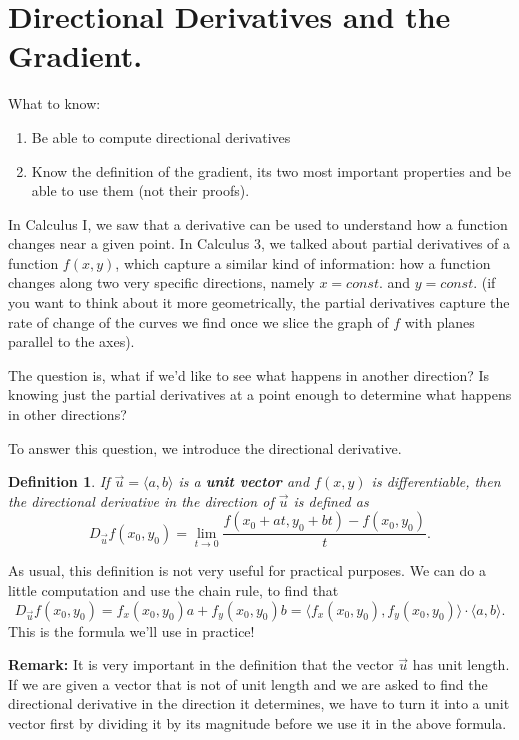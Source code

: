 \documentclass[12pt]{article}
\title{}
\newtheorem{definition}{Definition}
\newcommand{\vu}{\vec{u}}
\begin{document}
\section*{Directional Derivatives and the Gradient.}
What to know:
\begin{enumerate}
\item Be able to compute directional derivatives
\item Know the definition of the gradient, its two most important properties and be able to use them (not their proofs).
\end{enumerate}

In Calculus I, we saw that a derivative can be used to understand how a function changes near a given point. In Calculus 3, we talked about partial derivatives of a function $f(x,y)$, which capture a similar kind of information: how a function changes along two very specific directions, namely $x=const.$ and $y=const$. (if you want to think about it more geometrically, the partial derivatives capture the rate of change of the curves we find once we slice the graph of $f$ with planes parallel to the axes).

The question is, what if we'd like to see what happens in another direction? Is knowing just the partial derivatives at a point enough to determine what happens in other directions?

To answer this question, we introduce the directional derivative.

\begin{definition} If $\vu=\langle a,b\rangle$ is a \textbf{unit vector} and $f(x,y)$ is differentiable, then the directional derivative in the direction of $\vu$ is defined as $$D_{\vu} f(x_0,y_0)=\lim_{t\to 0}\dfrac{f(x_0+at,y_0+bt)-f(x_0,y_0)}{t}.$$
\end{definition}

As usual, this definition is not very useful for practical purposes. We can do a little computation and use the chain rule, to find that \begin{equation}\label{eq3}D_{\vu}f(x_0,y_0)=f_x(x_0,y_0)a+f_y(x_0,y_0)b=\langle f_x(x_0,y_0),f_y(x_0,y_0)\rangle \cdot\langle a,b\rangle.\end{equation} This is the formula we'll use in practice!

\textbf{Remark:} It is very important in the definition that the vector $\vu$ has unit length. If we are given a vector that is not of unit length and we are asked to find the directional derivative in the direction it determines, we have to turn it into a unit vector first by dividing it by its magnitude before we use it in the above formula.
\end{document}
